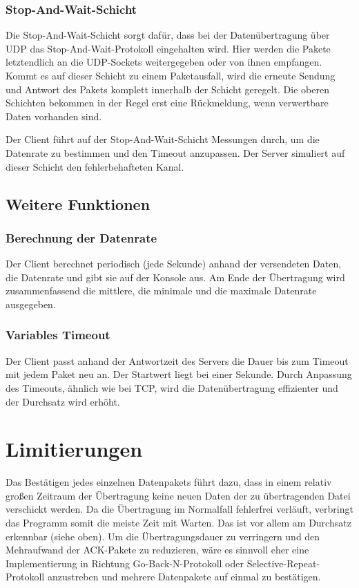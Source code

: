 \documentclass{article}
\begin{document}
			\subsubsection{Stop-And-Wait-Schicht}

			Die Stop-And-Wait-Schicht sorgt dafür, dass bei der Datenübertragung über UDP das Stop-And-Wait-Protokoll eingehalten wird. Hier werden die Pakete letztendlich an die UDP-Sockets weitergegeben oder von ihnen empfangen. Kommt es auf dieser Schicht zu einem Paketausfall, wird die erneute Sendung und Antwort des Pakets komplett innerhalb der Schicht geregelt. Die oberen Schichten bekommen in der Regel erst eine Rückmeldung, wenn verwertbare Daten vorhanden sind.

			Der Client führt auf der Stop-And-Wait-Schicht Messungen durch, um die Datenrate zu bestimmen und den Timeout anzupassen. Der Server simuliert auf dieser Schicht den fehlerbehafteten Kanal.

		\subsection{Weitere Funktionen}

			\subsubsection{Berechnung der Datenrate}

			Der Client berechnet periodisch (jede Sekunde) anhand der versendeten Daten, die Datenrate und gibt sie auf der Konsole aus. Am Ende der Übertragung wird zusammenfassend die mittlere, die minimale und die maximale Datenrate ausgegeben.

			\subsubsection{Variables Timeout}

			Der Client passt anhand der Antwortzeit des Servers die Dauer bis zum Timeout mit jedem Paket neu an. Der Startwert liegt bei einer Sekunde. Durch Anpassung des Timeouts, ähnlich wie bei TCP, wird die Datenübertragung effizienter und der Durchsatz wird erhöht.

	\section{Limitierungen}

	Das Bestätigen jedes einzelnen Datenpakets führt dazu, dass in einem relativ großen Zeitraum der Übertragung keine neuen Daten der zu übertragenden Datei verschickt werden. Da die Übertragung im Normalfall fehlerfrei verläuft, verbringt das Programm somit die meiste Zeit mit Warten. Das ist vor allem am Durchsatz erkennbar (siehe oben). Um die Übertragungsdauer zu verringern und den Mehraufwand der ACK-Pakete zu reduzieren, wäre es sinnvoll eher eine Implementierung in Richtung Go-Back-N-Protokoll oder Selective-Repeat-Protokoll anzustreben und mehrere Datenpakete auf einmal zu bestätigen.
\end{document}
